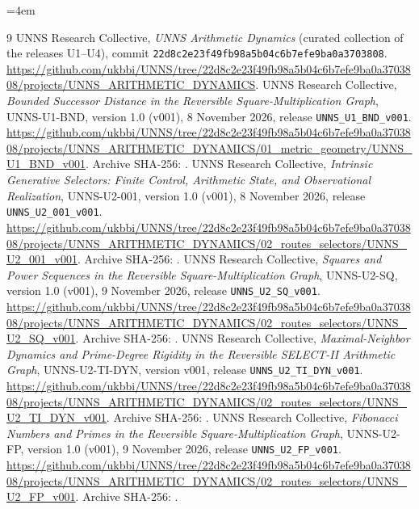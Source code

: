 \begingroup\emergencystretch=4em\small
\begin{thebibliography}{9}
 UNNS Research Collective, \emph{UNNS Arithmetic Dynamics} (curated collection of the releases U1--U4), commit \texttt{22d8c2e23f49fb98a5b04c6b7efe9ba0a3703808}. \url{https://github.com/ukbbi/UNNS/tree/22d8c2e23f49fb98a5b04c6b7efe9ba0a3703808/projects/UNNS_ARITHMETIC_DYNAMICS}.
 UNNS Research Collective, \emph{Bounded Successor Distance in the Reversible Square-Multiplication Graph}, UNNS-U1-BND, version 1.0 (v001), 8 November 2026, release \texttt{UNNS\_U1\_BND\_v001}. \url{https://github.com/ukbbi/UNNS/tree/22d8c2e23f49fb98a5b04c6b7efe9ba0a3703808/projects/UNNS_ARITHMETIC_DYNAMICS/01_metric_geometry/UNNS_U1_BND_v001}. Archive SHA-256: .
 UNNS Research Collective, \emph{Intrinsic Generative Selectors: Finite Control, Arithmetic State, and Observational Realization}, UNNS-U2-001, version 1.0 (v001), 8 November 2026, release \texttt{UNNS\_U2\_001\_v001}. \url{https://github.com/ukbbi/UNNS/tree/22d8c2e23f49fb98a5b04c6b7efe9ba0a3703808/projects/UNNS_ARITHMETIC_DYNAMICS/02_routes_selectors/UNNS_U2_001_v001}. Archive SHA-256: .
 UNNS Research Collective, \emph{Squares and Power Sequences in the Reversible Square-Multiplication Graph}, UNNS-U2-SQ, version 1.0 (v001), 9 November 2026, release \texttt{UNNS\_U2\_SQ\_v001}. \url{https://github.com/ukbbi/UNNS/tree/22d8c2e23f49fb98a5b04c6b7efe9ba0a3703808/projects/UNNS_ARITHMETIC_DYNAMICS/02_routes_selectors/UNNS_U2_SQ_v001}. Archive SHA-256: .
 UNNS Research Collective, \emph{Maximal-Neighbor Dynamics and Prime-Degree Rigidity in the Reversible SELECT-II Arithmetic Graph}, UNNS-U2-TI-DYN, version v001, release \texttt{UNNS\_U2\_TI\_DYN\_v001}. \url{https://github.com/ukbbi/UNNS/tree/22d8c2e23f49fb98a5b04c6b7efe9ba0a3703808/projects/UNNS_ARITHMETIC_DYNAMICS/02_routes_selectors/UNNS_U2_TI_DYN_v001}. Archive SHA-256: .
 UNNS Research Collective, \emph{Fibonacci Numbers and Primes in the Reversible Square-Multiplication Graph}, UNNS-U2-FP, version 1.0 (v001), 9 November 2026, release \texttt{UNNS\_U2\_FP\_v001}. \url{https://github.com/ukbbi/UNNS/tree/22d8c2e23f49fb98a5b04c6b7efe9ba0a3703808/projects/UNNS_ARITHMETIC_DYNAMICS/02_routes_selectors/UNNS_U2_FP_v001}. Archive SHA-256: .

\end{thebibliography}
